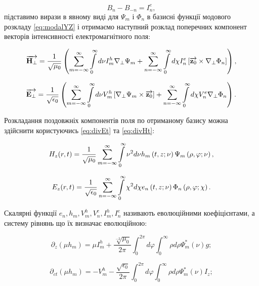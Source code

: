 \begin{equation}
B_n - B_{-n} = I_n^e,
\end{equation}
%
підставимо вирази в явному виді для $ \Psi_m $ і $ \Phi_n $ в базисні функції 
модового розкладу \eqref{eq:modalYZ} і отримаємо наступний розклад поперечних 
компонент векторів інтенсивності електромагнітного поля:

\begin{equation}
\overrightarrow{\mathbf H_\perp} = \frac{1}{\sqrt{\mu_0}} \left( 
\sum \limits_{m=-\infty}^{\infty} \int \limits_{0}^{\infty} d \nu
I_m^h \nabla_\perp \Psi_m + \sum \limits_{n=-\infty}^{\infty}
\int \limits_{0}^{\infty} d \chi I_n^e 
\left[ \overrightarrow{\mathbf z_0} \times \nabla_\perp \Phi_n \right] \right),
\end{equation}

\begin{equation} 
\overrightarrow{\mathbf E_\perp} = \frac{1}{\sqrt{\epsilon_0}} \left( 
\sum \limits_{m=-\infty}^{\infty} \int \limits_{0}^{\infty} 
d \nu V_m^h \left[  \nabla_\perp \Psi_m  \times  \overrightarrow{\mathbf z_0}  \right] +
\sum \limits_{n=-\infty}^{\infty} \int \limits_{0}^{\infty}
d \chi V_n^e \nabla_\perp \Phi_n \right).
\end{equation}

Розкладання поздовжніх компонентів поля по отриманому базису можна здійснити
користуючись \eqref{eq:divEt} та \eqref{eq:divHt}:

\begin{equation} 
H_z (r,t) = \frac{1}{\sqrt{\mu_0}} \sum \limits_{m=-\infty}^\infty
\int \limits_0^\infty \nu^2 d \nu 
h_m \left( t, z; \nu \right) \Psi_m \left( \rho, \varphi; \nu \right),
\end{equation}

\begin{equation} 
E_z (r,t) = \frac{1}{\sqrt{\epsilon_0}} \sum \limits_{n=-\infty}^\infty
\int \limits_0^\infty \chi^2 d \chi 
e_n \left( t, z; \nu \right)  \Phi_n \left( \rho, \varphi; \chi \right).
\end{equation}

Скалярні функції $ e_n, h_m, V_m^h, V_n^e, I_m^h, I_n^e  $ називають 
еволюційними коефіцієнтами, а систему рівнянь що їх визначає еволюційною:

\begin{equation} \label{eq:evo1}
\partial_z (\mu h_m) = \mu I_m^h + \frac{\sqrt[-2]{\mu_0}}{2 \pi}
\int_0^{2\pi} d \varphi \int_0^{\infty} \rho d \rho
\Psi_m^* (\nu) g;
\end{equation}

\begin{equation} \label{eq:evo2}
\partial_{ct} (\mu h_m) = - V_m^h - \frac{\sqrt{\epsilon_0}}{2 \pi}
\int_0^{2\pi} d \varphi \int_0^{\infty} \rho d \rho
\Psi_m^* (\nu) I_z;
\end{equation}

